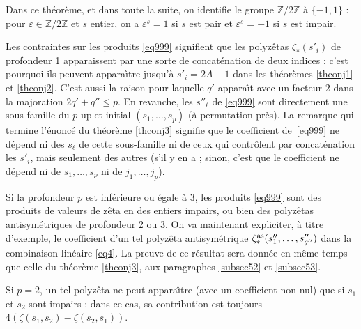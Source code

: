 \documentclass[12pt,francais, reqno]{smfart}
\numberwithin{equation}{section}
\newcommand{\Z}{\mathbb Z}
\newcommand{\zdz}{\Z / 2 \Z}
\newcommand{\eps}{\varepsilon}
\newcommand{\zetaetoile}{\zeta _*}
\newcommand{\zetaetoileantisym}{\zeta _* ^{{\rm as}}}
\begin{document}
Dans ce th\'eor\`eme, et dans toute la suite, on identifie le groupe $\zdz$ \`a $\{-1, 1\}$ : pour 
$\eps \in \zdz$ et $s $ entier, on a $\eps^s = 1$ si $s$ est pair et $\eps^s = -1$ si $s$ est impair.

\bigskip

Les contraintes sur les produits \eqref{eq999} signifient que les polyz\^etas $\zetaetoile(s'_i)$ 
de profondeur 1   apparaissent par une sorte de concat\'enation de deux indices : c'est pourquoi ils 
peuvent appara\^{\i}tre jusqu'\`a $s'_i = 2A - 1$ dans les th\'eor\`emes \ref{thconj1} et \ref{thconj2}. 
C'est aussi la raison pour laquelle $q'$ appara\^{\i}t avec un facteur 2 dans la majoration $2q'+q'' \leq p$. 
En revanche, les $s''_\ell$ de \eqref{eq999} sont directement une sous-famille du $p$-uplet 
initial $(s_1, \ldots,  s_p)$ (\`a permutation pr\`es). La remarque qui termine l'\'enonc\'e du th\'eor\`eme 
\ref{thconj3} signifie que le coefficient de~\eqref{eq999} ne d\'epend ni des $s_\ell$ de cette sous-famille 
ni de ceux qui contr\^olent par concat\'enation les $s'_i$, mais seulement des autres (s'il y en a ; sinon, 
c'est que le coefficient ne d\'epend ni de $s_1, \ldots, s_p$ ni de $j_1, \ldots, j_p$). 

\bigskip

Si la profondeur $p$ est inf\'erieure ou \'egale \`a 3, les produits \eqref{eq999}  
sont des produits de valeurs de z\^eta en des entiers impairs,  ou bien des polyz\^etas 
antisym\'etriques de profondeur 2 ou 3. On va maintenant expliciter, \`a titre d'exemple,  
le coefficient d'un  tel polyz\^eta antisym\'etrique $\zetaetoileantisym (s''_{1}, \ldots, 
s''_{q''})$ dans la combinaison lin\'eaire \eqref{eq4}. La preuve de ce r\'esultat sera donn\'ee 
en m\^eme temps que celle du th\'eor\`eme \ref{thconj3}, aux paragraphes \ref{subsec52} et \ref{subsec53}.  

\smallskip

Si $p=2$, un tel polyz\^eta ne peut  appara\^{\i}tre (avec un coefficient non nul) que  si $s_1$ et $s_2$  sont impairs ; dans ce cas, sa contribution est toujours $4 ( \zeta(s_1, s_2) - \zeta(s_2, s_1))$.
\end{document}
